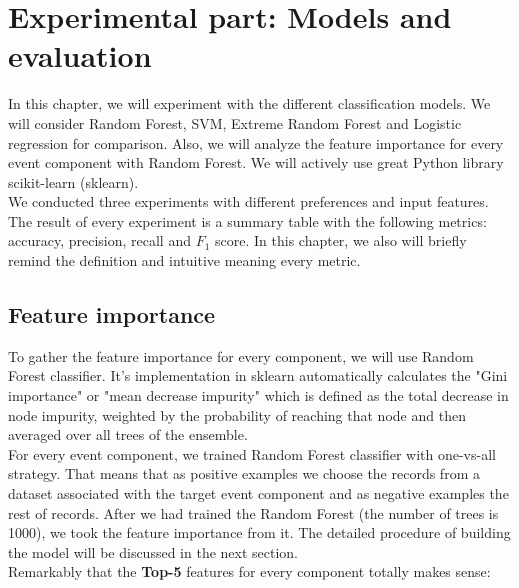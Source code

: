 \chapter{Experimental part: Models and evaluation}
\label{chap:model}
In this chapter, we will experiment with the different classification models. We will consider Random Forest, SVM, Extreme Random Forest \cite{ExtRF} and Logistic regression for comparison. Also, we will analyze the feature importance for every event component with Random Forest. We will actively use great Python library scikit-learn (sklearn).\\

We conducted three experiments with different preferences and input features. The result of every experiment is a summary table with the following metrics: accuracy, precision, recall and $F_1$ score. In this chapter, we also will briefly remind the definition and intuitive meaning every metric.\\

\section{Feature importance}
To gather the feature importance for every component, we will use Random Forest classifier. It's implementation in sklearn automatically calculates the "Gini importance" or "mean decrease impurity" which is defined as the total decrease in node impurity, weighted by the probability of reaching that node and then averaged over all trees of the ensemble.\\

For every event component, we trained Random Forest classifier with one-vs-all strategy. That means that as positive examples we choose the records from a dataset associated with the target event component and as negative examples the rest of records. After we had trained the Random Forest (the number of trees is 1000), we took the feature importance from it. The detailed procedure of building the model will be discussed in the next section.\\

Remarkably that the \textbf{Top-5} features for every component totally makes sense:

